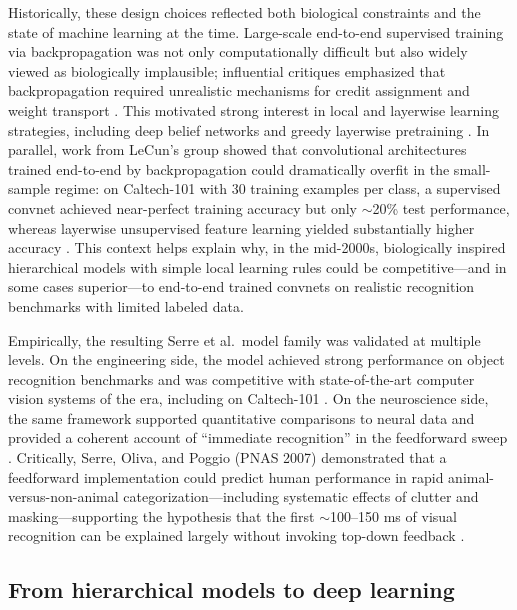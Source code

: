 \documentclass[11pt,a4paper]{article}
\begin{document}
Historically, these design choices reflected both biological constraints and the state of machine learning at the time. Large-scale end-to-end supervised training via backpropagation was not only computationally difficult but also widely viewed as biologically implausible; influential critiques emphasized that backpropagation required unrealistic mechanisms for credit assignment and weight transport \citep{Crick1989}. This motivated strong interest in local and layerwise learning strategies, including deep belief networks and greedy layerwise pretraining \citep{Hinton2006,Bengio2007,Larochelle2009}. In parallel, work from LeCun’s group showed that convolutional architectures trained end-to-end by backpropagation could dramatically overfit in the small-sample regime: on Caltech-101 with 30 training examples per class, a supervised convnet achieved near-perfect training accuracy but only $\sim$20\% test performance, whereas layerwise unsupervised feature learning yielded substantially higher accuracy \citep{Ranzato2007}. This context helps explain why, in the mid-2000s, biologically inspired hierarchical models with simple local learning rules could be competitive---and in some cases superior---to end-to-end trained convnets on realistic recognition benchmarks with limited labeled data.

Empirically, the resulting Serre et al.\ model family was validated at multiple levels. On the engineering side, the model achieved strong performance on object recognition benchmarks and was competitive with state-of-the-art computer vision systems of the era, including on Caltech-101 \citep{Serre2005cvpr,Serre2007pami}. On the neuroscience side, the same framework supported quantitative comparisons to neural data and provided a coherent account of ``immediate recognition'' in the feedforward sweep \citep{Serre2007}. Critically, Serre, Oliva, and Poggio (PNAS 2007) demonstrated that a feedforward implementation could predict human performance in rapid animal-versus-non-animal categorization---including systematic effects of clutter and masking---supporting the hypothesis that the first $\sim$100--150 ms of visual recognition can be explained largely without invoking top-down feedback \citep{Serre2007pnas,Thorpe1996}.

\subsection{From hierarchical models to deep learning}
\end{document}
